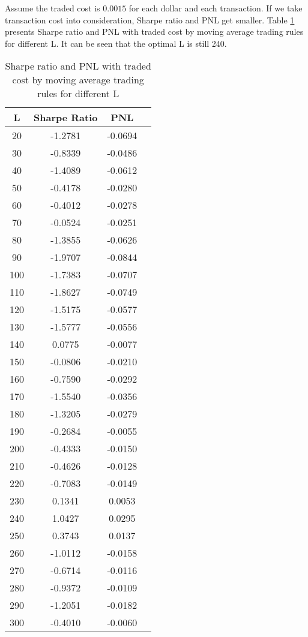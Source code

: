 \documentclass[11pt]{article}
\begin{document}
Assume the traded cost is $0.0015$ for each dollar and each transaction. If we take transaction cost into consideration, Sharpe ratio and PNL get smaller. Table \ref{MA_tc} presents Sharpe ratio and PNL with traded cost by moving average trading rules for different L. It can be seen that the optimal L is still 240.
\begin{table}[ht]
\centering
\begin{tabular}{cccc}
  \hline
 L & Sharpe Ratio & PNL \\ 
   \hline
20 & -1.2781 & -0.0694 \\ 
     30 & -0.8339 & -0.0486 \\ 
     40 & -1.4089 & -0.0612 \\ 
     50 & -0.4178 & -0.0280 \\ 
     60 & -0.4012 & -0.0278 \\ 
     70 & -0.0524 & -0.0251 \\ 
     80 & -1.3855 & -0.0626 \\ 
     90 & -1.9707 & -0.0844 \\ 
    100 & -1.7383 & -0.0707 \\ 
    110 & -1.8627 & -0.0749 \\ 
    120 & -1.5175 & -0.0577 \\ 
    130 & -1.5777 & -0.0556 \\ 
    140 & 0.0775 & -0.0077 \\ 
    150 & -0.0806 & -0.0210 \\ 
    160 & -0.7590 & -0.0292 \\ 
    170 & -1.5540 & -0.0356 \\ 
    180 & -1.3205 & -0.0279 \\ 
    190 & -0.2684 & -0.0055 \\ 
    200 & -0.4333 & -0.0150 \\ 
    210 & -0.4626 & -0.0128 \\ 
    220 & -0.7083 & -0.0149 \\ 
    230 & 0.1341 & 0.0053 \\ 
    240 & 1.0427 & 0.0295 \\ 
    250 & 0.3743 & 0.0137 \\ 
    260 & -1.0112 & -0.0158 \\ 
    270 & -0.6714 & -0.0116 \\ 
    280 & -0.9372 & -0.0109 \\ 
    290 & -1.2051 & -0.0182 \\ 
    300 & -0.4010 & -0.0060 \\ 
   \hline

\end{tabular}
\caption{Sharpe ratio and PNL with traded cost by moving average trading rules for different L}\label{MA_tc}
\end{table}
\end{document}
